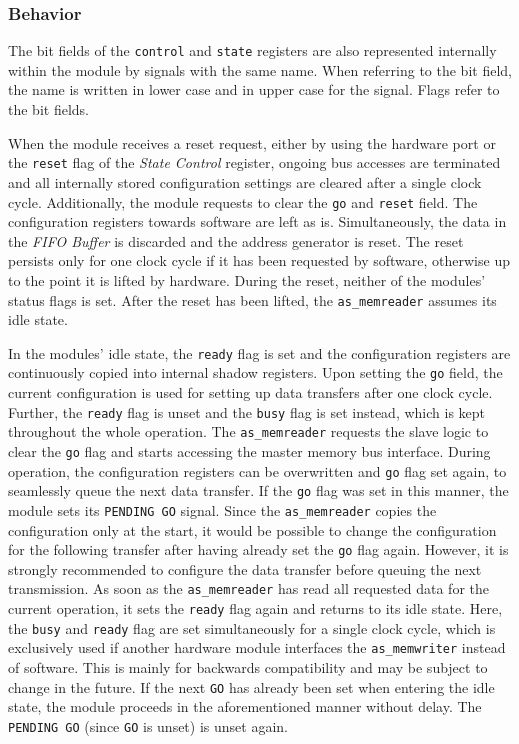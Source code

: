 \subsubsection{Behavior}
The bit fields of the \texttt{control} and \texttt{state} registers are also represented internally within the module by signals with the same name.
When referring to the bit field, the name is written in lower case and in upper case for the signal.
Flags refer to the bit fields.

When the module receives a reset request, either by using the hardware port or the \texttt{reset} flag of the \textit{State Control} register, ongoing bus accesses are terminated and all internally stored configuration settings are cleared after a single clock cycle.
Additionally, the module requests to clear the \texttt{go} and \texttt{reset} field.
The configuration registers towards software are left as is.
Simultaneously, the data in the \textit{FIFO Buffer} is discarded and the address generator is reset.
The reset persists only for one clock cycle if it has been requested by software, otherwise up to the point it is lifted by hardware.
During the reset, neither of the modules' status flags is set.
After the reset has been lifted, the \texttt{as\_memreader} assumes its idle state.


In the modules' idle state, the \texttt{ready} flag is set and the configuration registers are continuously copied into internal shadow registers.
Upon setting the \texttt{go} field, the current configuration is used for setting up data transfers after one clock cycle.
Further, the \texttt{ready} flag is unset and the \texttt{busy} flag is set instead, which is kept throughout the whole operation.
The \texttt{as\_memreader} requests the slave logic to clear the \texttt{go} flag and starts accessing the master memory bus interface.
During operation, the configuration registers can be overwritten and \texttt{go} flag set again, to seamlessly queue the next data transfer.
If the \texttt{go} flag was set in this manner, the module sets its \texttt{PENDING GO} signal.
Since the \texttt{as\_memreader} copies the configuration only at the start, it would be possible to change the configuration for the following transfer after having already set the \texttt{go} flag again.
However, it is strongly recommended to configure the data transfer before queuing the next transmission.
As soon as the \texttt{as\_memreader} has read all requested data for the current operation, it sets the \texttt{ready} flag again and returns to its idle state.
Here, the \texttt{busy} and \texttt{ready} flag are set simultaneously for a single clock cycle, which is exclusively used if another hardware module interfaces the \texttt{as\_memwriter} instead of software.
This is mainly for backwards compatibility and may be subject to change in the future.
If the next \texttt{GO} has already been set when entering the idle state, the module proceeds in the aforementioned manner without delay.
The \texttt{PENDING GO} (since \texttt{GO} is unset) is unset again.


